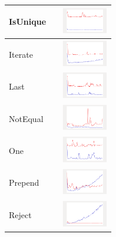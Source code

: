 \begin{longtable}{ m{2.5cm} m{8cm} m{2cm} }
IsUnique &

&
\includegraphics[width=2cm]{graphs/orderedset/small/isUnique}
\\\hline

Iterate &

&
\includegraphics[width=2cm]{graphs/orderedset/small/Iterate}
\\\hline

Last &

&
\includegraphics[width=2cm]{graphs/orderedset/small/Last}
\\\hline

NotEqual &

&
\includegraphics[width=2cm]{graphs/orderedset/small/NEQ}
\\\hline

One &

&
\includegraphics[width=2cm]{graphs/orderedset/small/One}
\\\hline

Prepend &

&
\includegraphics[width=2cm]{graphs/orderedset/small/Prepend}
\\\hline

Reject &

&
\includegraphics[width=2cm]{graphs/orderedset/small/Reject}
\\\hline


\end{longtable}
